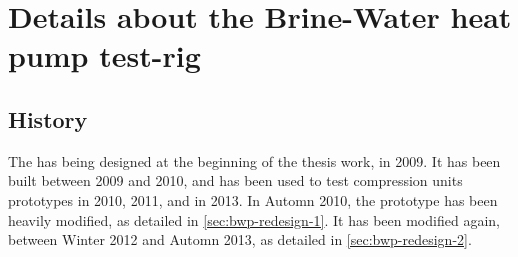 \chapter{Details about the Brine-Water heat pump test-rig}
\label{chap:bwp-components}
\resetallacronyms

\section{History}
\label{sec:bwp-history}

The \BWP{} has being designed at the beginning of the thesis work, in
2009. It has been built between 2009 and 2010, and has been used to
test compression units prototypes in 2010, 2011, and in
2013. In Automn
2010, the prototype has been heavily modified, as detailed in
\cref{sec:bwp-redesign-1}. It has been modified again, between Winter
2012 and Automn 2013, as detailed in \cref{sec:bwp-redesign-2}.

